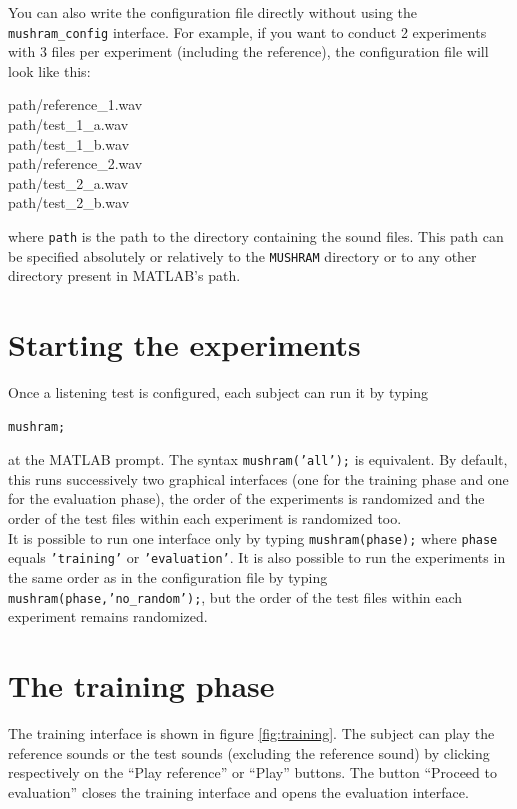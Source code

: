 \documentclass[11pt,a4paper]{book}
\begin{document}
You can also write the configuration file directly without using the \texttt{mushram\_config} interface. For example, if you want to conduct 2 experiments with 3 files per experiment (including the reference), the configuration file will look like this:\\[.5em]
\begin{tt}
path/reference\_1.wav\\
path/test\_1\_a.wav\\
path/test\_1\_b.wav\\[1em]
path/reference\_2.wav\\
path/test\_2\_a.wav\\
path/test\_2\_b.wav\\[.5em]
\end{tt}
where \texttt{path} is the path to the directory containing the sound files. This path can be specified absolutely or relatively to the \texttt{MUSHRAM} directory or to any other directory present in MATLAB's path.

\section{Starting the experiments}
Once a listening test is configured, each subject can run it by typing
\begin{verbatim}
mushram;
\end{verbatim}
at the MATLAB prompt. The syntax \texttt{mushram('all');} is equivalent. By default, this runs successively two graphical interfaces (one for the training phase and one for the evaluation phase), the order of the experiments is randomized and the order of the test files within each experiment is randomized too.\\
It is possible to run one interface only by typing \texttt{mushram(phase);} where \texttt{phase} equals \texttt{'training'} or \texttt{'evaluation'}. It is also possible to run the experiments in the same order as in the configuration file by typing \texttt{mushram(phase,'no\_random');}, but the order of the test files within each experiment remains randomized.

\section{The training phase}
The training interface is shown in figure \ref{fig:training}. The subject can play the reference sounds or the test sounds (excluding the reference sound) by clicking respectively on the ``Play reference'' or ``Play'' buttons. The button ``Proceed to evaluation'' closes the training interface and opens the evaluation interface.
\end{document}
